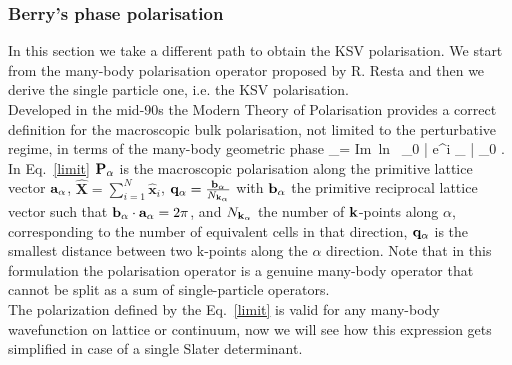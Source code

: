 \subsubsection{Berry's phase polarisation}
In this section we take a different path to obtain the KSV polarisation. We start from the many-body polarisation operator proposed by R. Resta and then we derive the single particle one, i.e.  the KSV polarisation.\\
Developed in the mid-90s the Modern Theory of Polarisation\cite{RevModPhys.66.899} provides a correct definition for the macroscopic bulk polarisation, not limited to the perturbative regime, in terms of the many-body geometric phase 
\be 
\PP_\alpha =   \mbox{Im ln }  \langle \Psi_0 | {\rm e}^{i \qq_\alpha \cdot {}} | \Psi_0 \rangle . \label{limit} 
\ee
In Eq.~\eqref{limit} ${\bf P}_\alpha$ is the macroscopic polarisation along the primitive lattice vector ${\bf a}_\alpha$, $\hat{\mathbf X} = \sum_{i=1}^{N} \hat{\mathbf x}_i$, ${\bf q}_\alpha = \frac{{\bf b}_\alpha}{N_{{\bf k}_\alpha}}$ with ${\bf b}_\alpha$ the primitive reciprocal lattice vector such that ${\bf b}_\alpha\cdot{\bf a}_\alpha=2\pi$, and $N_{{\bf k}_\alpha}$ the number of ${\bf k}$-points along $\alpha$, corresponding to the number of equivalent cells in that direction, ${\bf q}_\alpha$ is the smallest distance between two k-points along the $\alpha$ direction.
Note that in this formulation the polarisation operator is a genuine many-body operator that cannot be split as a sum of single-particle operators. \\
The polarization defined by the Eq.~\ref{limit} is valid for any many-body wavefunction on lattice or continuum\cite{PhysRevLett.80.1800,resta1999electron}, now we will see how this expression gets simplified in case of a single Slater determinant.



